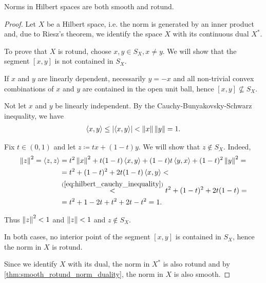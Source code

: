 \begin{proposition}\label{thm:hilbert_space_smooth_rotund}\cite[exercise 2.37(c)]{Phelps1993}
  Norms in Hilbert spaces are both smooth and rotund.
\end{proposition}
\begin{proof}
  Let \( X \) be a Hilbert space, i.e. the norm is generated by an inner product and, due to Riesz's theorem, we identify the space \( X \) with its continuous dual \( X^* \).

  To prove that \( X \) is rotund, choose \( x, y \in S_X, x \neq y \). We will show that the segment \( [x, y] \) is not contained in \( S_X \).

  If \( x \) and \( y \) are linearly dependent, necessarily \( y = -x \) and all non-trivial convex combinations of \( x \) and \( y \) are contained in the open unit ball, hence \( [x, y] \not\subseteq S_X \).

  Not let \( x \) and \( y \) be linearly independent. By the Cauchy-Bunyakovsky-Schwarz inequality, we have
  \begin{align}\label{eq:hilbert_cauchy_inequality}
    \left\langle x, y \right\rangle \leq \left\vert \left\langle x, y \right\rangle \right\vert < \left\Vert x \right\Vert \left\Vert y \right\Vert = 1.
  \end{align}

  Fix \( t \in (0, 1) \) and let \( z \coloneqq tx + (1-t)y \). We will show that \( z \not\in S_X \). Indeed,
  \begin{align*}
    \left\Vert z \right\Vert^2
    =
    \left\langle z, z \right\rangle
    &=
    t^2 \left\Vert x \right\Vert^2 + t(1-t) \left\langle x, y \right\rangle + (1-t) t \left\langle y, x \right\rangle + (1-t)^2 \left\Vert y \right\Vert^2
    = \\ &=
    t^2 + (1-t)^2 + 2 t(1-t) \left\langle x, y \right\rangle
    < \\ &\overset {(\ref{eq:hilbert_cauchy_inequality})} <
    t^2 + (1-t)^2 + 2 t(1-t)
    = \\ &=
    t^2 + 1 - 2t + t^2 + 2t - t^2
    =
    1.
  \end{align*}

  Thus \( \left\Vert z \right\Vert^2 < 1 \) and \( \left\Vert z \right\Vert < 1 \) and \( z \not\in S_X \).

  In both cases, no interior point of the segment \( [x, y] \) is contained in \( S_X \), hence the norm in \( X \) is rotund.

  Since we identify \( X \) with its dual, the norm in \( X^* \) is also rotund and by \cref{thm:smooth_rotund_norm_duality}, the norm in \( X \) is also smooth.
\end{proof}

